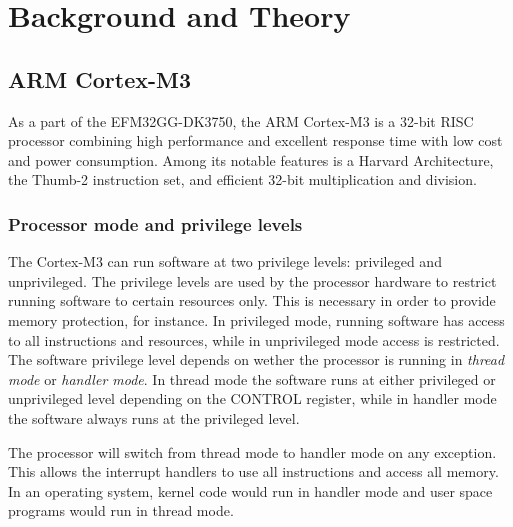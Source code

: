 \chapter{Background and Theory}


\section{ARM Cortex-M3}
As a part of the EFM32GG-DK3750, the ARM Cortex-M3 is a 32-bit RISC processor combining high performance and excellent response time with low cost and power consumption. Among its notable features is a Harvard Architecture, the Thumb-2 instruction set, and efficient 32-bit multiplication and division.

\subsection{Processor mode and privilege levels}
The Cortex-M3 can run software at two privilege levels: privileged and unprivileged. The privilege levels are used by the processor hardware to restrict running software to certain resources only. This is necessary in order to provide memory protection, for instance. In privileged mode, running software has access to all instructions and resources, while in unprivileged mode access is restricted. The software privilege level depends on wether the processor is running in \emph{thread mode} or \emph{handler mode}. In thread mode the software runs at either privileged or unprivileged level depending on the CONTROL register, while in handler mode the software always runs at the privileged level.

The processor will switch from thread mode to handler mode on any exception. This allows the interrupt handlers to use all instructions and access all memory. In an operating system, kernel code would run in handler mode and user space programs would run in thread mode. 


